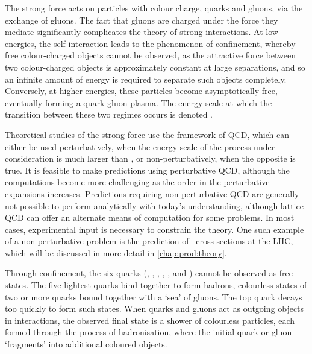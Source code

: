 \begin{table}
  \centering
  \caption{%
    Properties of the fundamental particles of the \acl{SM}~\cite{PDG2014}. The
    electric charge is given in units of the electron charge.
  }
  \label{tab:intro:sm:particles}
  
\end{table}

The strong force acts on particles with colour charge, quarks and gluons, via 
the exchange of gluons.
The fact that gluons are charged under the force they mediate significantly 
complicates the theory of strong interactions.
At low energies, the self interaction leads to the phenomenon of confinement, 
whereby free colour-charged objects cannot be observed, as the attractive force 
between two colour-charged objects is approximately constant at large 
separations, and so an infinite amount of energy is required to separate such 
objects completely.
Conversely, at higher energies, these particles become asymptotically free, 
eventually forming a quark-gluon plasma.
The energy scale at which the transition between these two regimes occurs is 
denoted \qcdscale.

Theoretical studies of the strong force use the framework of \ac{QCD}, which 
can either be used perturbatively, when the energy scale of the process under 
consideration is much larger than \qcdscale, or non-perturbatively, when the 
opposite is true.
It is feasible to make predictions using perturbative \ac{QCD}, although the 
computations become more challenging as the order in the perturbative 
expansions increases.
Predictions requiring non-perturbative \ac{QCD} are generally not possible to 
perform analytically with today's understanding, although lattice \ac{QCD} can 
offer an alternate means of computation for some problems.
In most cases, experimental input is necessary to constrain the theory.
One such example of a non-perturbative problem is the prediction of \pp\ 
cross-sections at the \ac{LHC}, which will be discussed in more detail in 
\cref{chap:prod:theory}.

Through confinement, the six quarks (\Pup, \Pdown, \Pcharm, \Pstrange, \Ptop, 
and \Pbottom) cannot be observed as free states.
The five lightest quarks bind together to form hadrons, colourless states of 
two or more quarks bound together with a `sea' of gluons.
The top quark decays too quickly to form such states.
When quarks and gluons act as outgoing objects in interactions, the observed 
final state is a shower of colourless particles, each formed through the 
process of hadronisation, where the initial quark or gluon ‘fragments’ into 
additional coloured objects.

